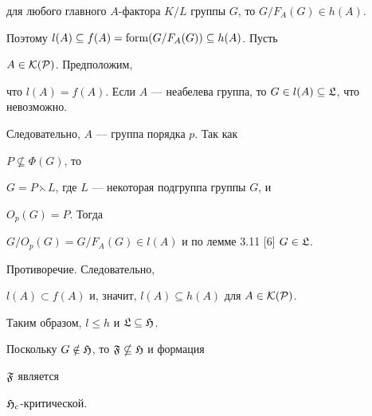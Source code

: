 \begin{pf}
для любого главного $A$-фактора $K/L$ группы $G$, то $G/F_A(G)\in 


h(A)$. 


Поэтому $l(A)\subseteq f(A)=\operatorname{form}(G/F_A(G))\subseteq h(A)$. Пусть 


$A\in\cal K(P)$. Предположим,


что $l(A)=f(A)$. Если $A$ --- неабелева группа, то $G\in 


l(A)\subseteq\frak L$, что невозможно. 


Следовательно, $A$ --- группа порядка $p$. Так как 


$P\nsubseteq\Phi(G)$, то 


$G=P\leftthreetimes L$, где $L$ --- некоторая подгруппа группы $G$, и 


$O_p(G)=P$. Тогда 


$G/O_p(G)=G/F_A(G)\in l(A)$ и по лемме 3.11 [6] $G\in\frak L$. 


Противоречие. Следовательно, 


$l(A)\subset f(A)$ и, значит, $l(A)\subseteq h(A)$ для $A\in\cal K(P)$. 


Таким образом, $l\le h$ и $\frak L\subseteq\frak H$. 


Поскольку $G\notin\frak H$, то $\frak F\nsubseteq\frak H$ и формация 


$\frak F$ является 


$\frak H_c$-критической. 


\end{pf} 


 


